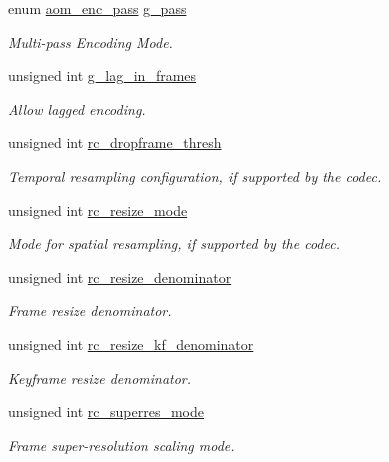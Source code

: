 \begin{DoxyCompactItemize}
enum \hyperlink{group__encoder_ga92b6709b58dc3435e3ba652da562eda1}{aom\+\_\+enc\+\_\+pass} \hyperlink{structaom__codec__enc__cfg_aad58e4d10c7904d50ce959aef202dc64}{g\+\_\+pass}
\begin{DoxyCompactList}\small\item\em Multi-\/pass Encoding Mode. \end{DoxyCompactList}\item 
unsigned int \hyperlink{structaom__codec__enc__cfg_a614a49318f2011cc8735d7e51b910fa4}{g\+\_\+lag\+\_\+in\+\_\+frames}
\begin{DoxyCompactList}\small\item\em Allow lagged encoding. \end{DoxyCompactList}\item 
unsigned int \hyperlink{structaom__codec__enc__cfg_a0b64b07e9238ee51f6195b1bbb7cd2fd}{rc\+\_\+dropframe\+\_\+thresh}
\begin{DoxyCompactList}\small\item\em Temporal resampling configuration, if supported by the codec. \end{DoxyCompactList}\item 
unsigned int \hyperlink{structaom__codec__enc__cfg_ab9123d944cd168511d65c823b30d5705}{rc\+\_\+resize\+\_\+mode}
\begin{DoxyCompactList}\small\item\em Mode for spatial resampling, if supported by the codec. \end{DoxyCompactList}\item 
unsigned int \hyperlink{structaom__codec__enc__cfg_a0e1d616495fb994ed67418b90b14f168}{rc\+\_\+resize\+\_\+denominator}
\begin{DoxyCompactList}\small\item\em Frame resize denominator. \end{DoxyCompactList}\item 
unsigned int \hyperlink{structaom__codec__enc__cfg_a5da400d15cfd927a18e17a44985b910a}{rc\+\_\+resize\+\_\+kf\+\_\+denominator}
\begin{DoxyCompactList}\small\item\em Keyframe resize denominator. \end{DoxyCompactList}\item 
unsigned int \hyperlink{structaom__codec__enc__cfg_a704ff1b4202b1d5499928b98eef17424}{rc\+\_\+superres\+\_\+mode}
\begin{DoxyCompactList}\small\item\em Frame super-\/resolution scaling mode. \end{DoxyCompactList}\item 

\end{DoxyCompactItemize}

